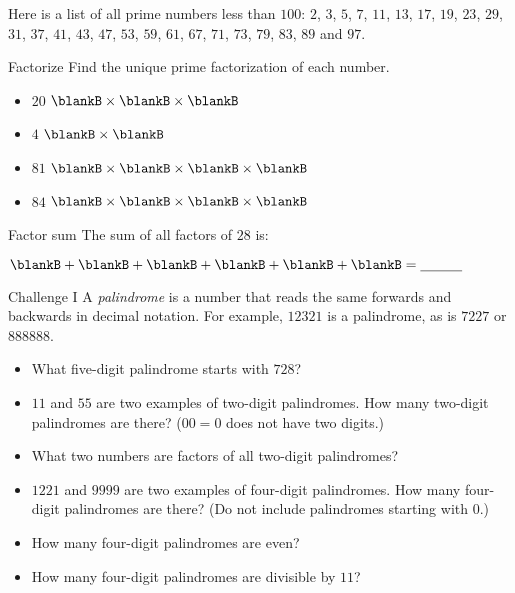\documentclass[12pt,letterpaper]{article}
\begin{document}
\pagebreak

Here is a list of all prime numbers less than $100$: $2$, $3$, $5$, $7$, $11$, $13$,
$17$, $19$, $23$, $29$, $31$, $37$, $41$, $43$, $47$, $53$, $59$, $61$, $67$,
$71$, $73$, $79$, $83$, $89$ and $97$.

\begin{problem}{Factorize}
 Find the unique prime factorization of each number.

 \begin{itemize}
  \item $20$ \hfill $\blankB \times \blankB \times \blankB$
  \item $4$ \hfill $\blankB \times \blankB$
  \item $81$ \hfill $\blankB \times \blankB \times \blankB \times \blankB$
  \item $84$ \hfill $\blankB \times \blankB \times \blankB \times \blankB$
 \end{itemize}
\end{problem}

\begin{problem}{Factor sum}
 The sum of all factors of $28$ is:

 $\blankB +
 \blankB +
 \blankB +
 \blankB +
 \blankB +
 \blankB = \underline{\hspace{3em}}$
\end{problem}


\begin{problem}{Challenge I}
 A \emph{palindrome} is a number that reads the same forwards and backwards in
 decimal notation. For example, $12321$ is a palindrome, as is $7227$ or
 $888888$.

 \begin{itemize}
  \item What five-digit palindrome starts with $728$? \underline{\hspace{5em}}
  \item $11$ and $55$ are two examples of two-digit palindromes.
  How many two-digit palindromes are there? ($00=0$ does not have two digits.)
  \item What two numbers are factors of all two-digit palindromes?
  \item $1221$ and $9999$ are two examples of four-digit palindromes. How many
  four-digit palindromes are there? (Do not include palindromes starting with
  $0$.)
  \item How many four-digit palindromes are even?
  \item How many four-digit palindromes are divisible by $11$?
 \end{itemize}
\end{problem}
\end{document}
